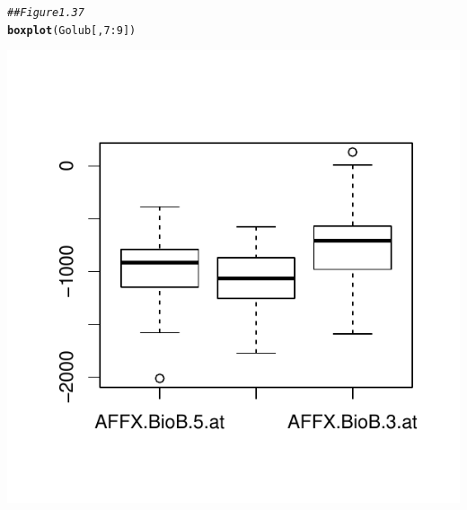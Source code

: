 \documentclass[11pt]{article}\usepackage[]{graphicx}\usepackage[]{color}
\makeatletter
\def\maxwidth{ %
  \ifdim\Gin@nat@width>\linewidth
    \linewidth
  \else
    \Gin@nat@width
  \fi
}
\newcommand{\hlnum}[1]{\textcolor[rgb]{0.686,0.059,0.569}{#1}}%
\newcommand{\hlcom}[1]{\textcolor[rgb]{0.678,0.584,0.686}{\textit{#1}}}%
\newcommand{\hlopt}[1]{\textcolor[rgb]{0,0,0}{#1}}%
\newcommand{\hlstd}[1]{\textcolor[rgb]{0.345,0.345,0.345}{#1}}%
\newcommand{\hlkwd}[1]{\textcolor[rgb]{0.737,0.353,0.396}{\textbf{#1}}}%
\newenvironment{kframe}{%
 \def\at@end@of@kframe{}%
 \ifinner\ifhmode%
  \def\at@end@of@kframe{\end{minipage}}%
  \begin{minipage}{\columnwidth}%
 \fi\fi%
 \def\FrameCommand##1{\hskip\@totalleftmargin \hskip-\fboxsep
 \colorbox{shadecolor}{##1}\hskip-\fboxsep
     \hskip-\linewidth \hskip-\@totalleftmargin \hskip\columnwidth}%
 \MakeFramed {\advance\hsize-\width
   \@totalleftmargin\z@ \linewidth\hsize
   \@setminipage}}%
 {\par\unskip\endMakeFramed%
 \at@end@of@kframe}
\newenvironment{knitrout}{}{} %
\makeatother
\begin{document}
\begin{knitrout}
\color{fgcolor}\begin{kframe}
\begin{alltt}
\hlcom{## Figure 1.37}
\hlkwd{boxplot}\hlstd{(Golub[,} \hlnum{7}\hlopt{:}\hlnum{9}\hlstd{])}
\end{alltt}
\end{kframe}
\includegraphics[width=\maxwidth]{figure/unnamed-chunk-35-1} 

\end{knitrout}
\end{document}
